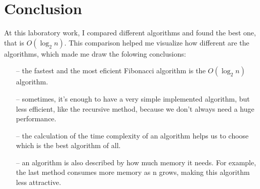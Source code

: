 \documentclass{article}
\begin{document}
	\section{Conclusion}
		At this laboratory work, I compared different algorithms and found the best one, that is \(O(\log_2 n)\). This comparison helped me visualize how different are the algorithms, which made me draw the folowing conclusions:
		\begin{itemize}
			\item[--] the fastest and the most eficient Fibonacci algorithm is the $O(\log_2 n)$ algorithm.
			\item[--] sometimes, it's enough to have a very simple implemented algorithm, but less efficient, like the recursive method, because we don't always need a huge performance.
			\item[--] the calculation of the time complexity of an algorithm helps us to choose which is the best algorithm of all.
			\item[--] an algorithm is also described by how much memory it needs. For example, the last method consumes more memory as n grows, making this algorithm less attractive.
		\end{itemize}
\end{document}
